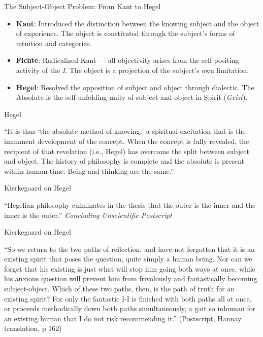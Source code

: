 \documentclass[fleqn]{beamer}
\begin{document}
\begin{frame}{The Subject-Object Problem: From Kant to Hegel}

\begin{itemize}
\item \textbf{Kant}: Introduced the distinction between the knowing
  subject and the object of experience. The object is constituted
  through the subject's forms of intuition and categories.

\item \textbf{Fichte}: Radicalized Kant — all objectivity arises from
  the self-positing activity of the \emph{I}. The object is a
  projection of the subject’s own limitation.

\item \textbf{Hegel}: Resolved the opposition of subject and object
  through dialectic. The Absolute is the self-unfolding unity of
  subject and object in Spirit (\emph{Geist}).

\end{itemize}  

\end{frame}

\begin{frame}{Hegel}

  ``It is thus `the absolute method of knowing,' a spiritual
  excitation that is the immanent development of the concept. When the
  concept is fully revealed, the recipient of that revelation (i.e.,
  Hegel) has overcome the split between subject and object. The
  history of philosophy is complete and the absolute is present within
  human time. Being and thinking are the same.'' \citep[35]{rosen}

\end{frame}

\begin{frame}{Kierkegaard on Hegel}

  ``Hegelian philosophy culminates in the thesis that the outer is the
  inner and the inner is the outer.'' \newline \emph{Concluding
    Unscientific Postscript}

\end{frame}

\begin{frame}{Kierkegaard on Hegel}

  ``So we return to the two paths of reflection, and have not
  forgotten that it is an existing spirit that poses the question,
  quite simply a human being. Nor can we forget that his existing is
  just what will stop him going both ways at once, while his anxious
  question will prevent him from frivolously and fantastically
  becoming subject-object. Which of these two paths, then, is the path
  of truth for an existing spirit? For only the fantastic I-I is
  finished with both paths all at once, or proceeds methodically down
  both paths simultaneously, a gait so inhuman for an existing human
  that I do not risk recommending it.'' (Postscript, Hannay
  translation, p 162)

\end{frame}
\end{document}
